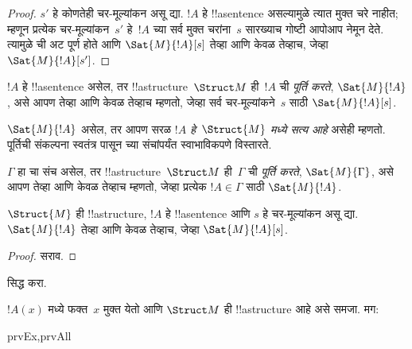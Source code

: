 \documentclass[../../../include/open-logic-section]{subfiles}
\begin{document}
\begin{proof}
  $s'$ हे कोणतेही चर-मूल्यांकन असू द्या. $!A$ हे !!a{sentence}
  असल्यामुळे त्यात मुक्त चरे नाहीत; म्हणून प्रत्येक चर-मूल्यांकन~$s'$
  हे~$!A$ च्या सर्व मुक्त चरांना~$s$ सारख्याच गोष्टी आपोआप नेमून देते.
  त्यामुळे  ची अट पूर्ण होते आणि
  $\Sat{M}{!A}[s]$ तेव्हा आणि केवळ तेव्हाच, जेव्हा
  $\Sat{M}{!A}[s']$.
\end{proof}

\begin{defn}
$!A$ हे !!a{sentence} असेल, तर !!a{structure}~$\Struct M$ ही~$!A$ ची
\emph{पूर्ति करते}, $\Sat{M}{!A}$, असे आपण तेव्हा आणि केवळ तेव्हाच
म्हणतो, जेव्हा सर्व चर-मूल्यांकने~$s$ साठी $\Sat{M}{!A}[s]$.
\end{defn}

$\Sat{M}{!A}$ असेल, तर आपण सरळ \emph{$!A$ हे~$\Struct{M}$ मध्ये सत्य
आहे} असेही म्हणतो. पूर्तिची संकल्पना स्वतंत्र पासून
च्या संचांपर्यंत स्वाभाविकपणे विस्तारते.

\begin{defn}
$\Gamma$ हा चा संच असेल, तर !!a{structure}~$\Struct M$
ही~$\Gamma$ ची \emph{पूर्ति करते}, $\Sat{M}{\Gamma}$, असे आपण तेव्हा
आणि केवळ तेव्हाच म्हणतो, जेव्हा प्रत्येक $!A \in \Gamma$ साठी
$\Sat{M}{!A}$.
\end{defn}

\begin{prop}
  $\Struct{M}$ ही !!a{structure}, $!A$ हे !!a{sentence} आणि $s$ हे
  चर-मूल्यांकन असू द्या. $\Sat{M}{!A}$ तेव्हा आणि केवळ तेव्हाच,
  जेव्हा $\Sat{M}{!A}[s]$.
\end{prop}

\begin{proof}
सराव.
\end{proof}

\begin{prob}
 सिद्ध करा.
\end{prob}

\begin{prop}
  $!A(x)$ मध्ये फक्त~$x$ मुक्त येतो आणि $\Struct M$ ही
  !!a{structure} आहे असे समजा. मग:
  \begin{tagenumerate}{prvEx,prvAll}
\end{tagenumerate}
\end{prop}
\end{document}
